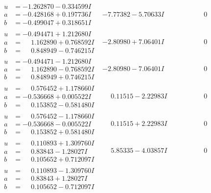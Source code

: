 \documentclass[1p]{elsarticle_modified}
\theoremstyle{definition}
\begin{document}
$$\begin{array}{c|c|c}
\begin{aligned}
u &= -1.262870 - 0.334599 I \\
a &= -0.428168 + 0.197736 I \\
b &= -0.499047 + 0.318651 I\end{aligned}
 & -7.77382 - 5.70633 I & \phantom{-0.000000 } 0 \\ \hline\begin{aligned}
u &= -0.494471 + 1.212680 I \\
a &= \phantom{-}1.162890 + 0.768592 I \\
b &= \phantom{-}0.848949 - 0.746215 I\end{aligned}
 & -2.80980 + 7.06401 I & \phantom{-0.000000 } 0 \\ \hline\begin{aligned}
u &= -0.494471 - 1.212680 I \\
a &= \phantom{-}1.162890 - 0.768592 I \\
b &= \phantom{-}0.848949 + 0.746215 I\end{aligned}
 & -2.80980 - 7.06401 I & \phantom{-0.000000 } 0 \\ \hline\begin{aligned}
u &= \phantom{-}0.576452 + 1.178660 I \\
a &= -0.536668 + 0.005522 I \\
b &= \phantom{-}0.153852 - 0.581480 I\end{aligned}
 & \phantom{-}0.11515 - 2.22983 I & \phantom{-0.000000 } 0 \\ \hline\begin{aligned}
u &= \phantom{-}0.576452 - 1.178660 I \\
a &= -0.536668 - 0.005522 I \\
b &= \phantom{-}0.153852 + 0.581480 I\end{aligned}
 & \phantom{-}0.11515 + 2.22983 I & \phantom{-0.000000 } 0 \\ \hline\begin{aligned}
u &= \phantom{-}0.110893 + 1.309760 I \\
a &= \phantom{-}0.83843 - 1.28027 I \\
b &= \phantom{-}0.105652 + 0.712097 I\end{aligned}
 & \phantom{-}5.85335 - 4.03857 I & \phantom{-0.000000 } 0 \\ \hline\begin{aligned}
u &= \phantom{-}0.110893 - 1.309760 I \\
a &= \phantom{-}0.83843 + 1.28027 I \\
b &= \phantom{-}0.105652 - 0.712097 I\end{aligned}

\end{array}$$
\end{document}
